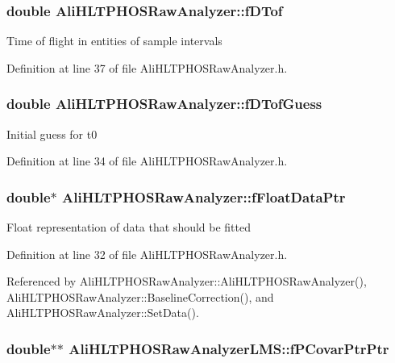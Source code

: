 \subsubsection{\setlength{\rightskip}{0pt plus 5cm}double {\bf Ali\-HLTPHOSRaw\-Analyzer::f\-DTof}\hspace{0.3cm}{\tt  [protected, inherited]}}\label{classAliHLTPHOSRawAnalyzer_AliHLTPHOSRawAnalyzerPeakFinderp5}


Time of flight in entities of sample intervals 

Definition at line 37 of file Ali\-HLTPHOSRaw\-Analyzer.h.
\subsubsection{\setlength{\rightskip}{0pt plus 5cm}double {\bf Ali\-HLTPHOSRaw\-Analyzer::f\-DTof\-Guess}\hspace{0.3cm}{\tt  [protected, inherited]}}\label{classAliHLTPHOSRawAnalyzer_AliHLTPHOSRawAnalyzerPeakFinderp2}


Initial guess for t0 

Definition at line 34 of file Ali\-HLTPHOSRaw\-Analyzer.h.
\subsubsection{\setlength{\rightskip}{0pt plus 5cm}double$\ast$ {\bf Ali\-HLTPHOSRaw\-Analyzer::f\-Float\-Data\-Ptr}\hspace{0.3cm}{\tt  [protected, inherited]}}\label{classAliHLTPHOSRawAnalyzer_AliHLTPHOSRawAnalyzerPeakFinderp0}


Float representation of data that should be fitted 

Definition at line 32 of file Ali\-HLTPHOSRaw\-Analyzer.h.

Referenced by Ali\-HLTPHOSRaw\-Analyzer::Ali\-HLTPHOSRaw\-Analyzer(), Ali\-HLTPHOSRaw\-Analyzer::Baseline\-Correction(), and Ali\-HLTPHOSRaw\-Analyzer::Set\-Data().
\subsubsection{\setlength{\rightskip}{0pt plus 5cm}double$\ast$$\ast$ {\bf Ali\-HLTPHOSRaw\-Analyzer\-LMS::f\-PCovar\-Ptr\-Ptr}\hspace{0.3cm}{\tt  [private]}}\label{classAliHLTPHOSRawAnalyzerLMS_AliHLTPHOSRawAnalyzerLMSr1}


